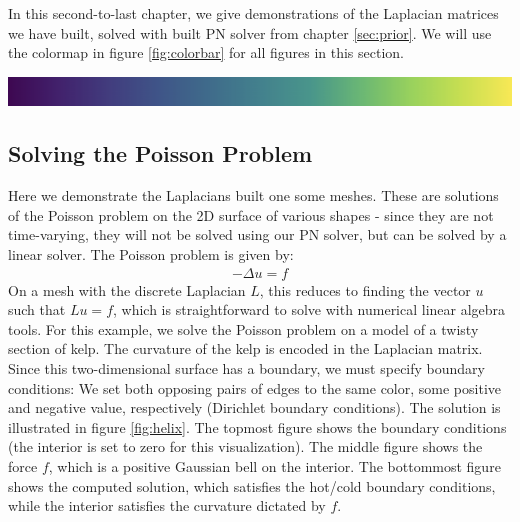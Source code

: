 \ifdefined\COMPILINGFROMMAIN
\else
    
    
\fi
\noindent
In this second-to-last chapter, we give demonstrations of the Laplacian matrices we have built, solved with built PN solver from chapter \ref{sec:prior}. We will use the colormap in figure \ref{fig:colorbar} for all figures in this section.
\\
\begin{center}
    \includegraphics[width=1.0\columnwidth]{../images/colorbar.png}
    \label{fig:colorbar}
\end{center}
\noindent

\subsection*{Solving the Poisson Problem}
Here we demonstrate the Laplacians built one some meshes. These are solutions of the Poisson problem on the 2D surface of various shapes - since they are not time-varying, they will not be solved using our PN solver, but can be solved by a linear solver. The Poisson problem is given by:
\begin{align}
    -\Delta u = f
\end{align}
On a mesh with the discrete Laplacian $L$, this reduces to finding the vector $u$ such that $Lu = f$, which is straightforward to solve with numerical linear algebra tools. For this example, we solve the Poisson problem on a model of a twisty section of kelp. The curvature of the kelp is encoded in the Laplacian matrix. Since this two-dimensional surface has a boundary, we must specify boundary conditions: We set both opposing pairs of edges to the same color, some positive and negative value, respectively (Dirichlet boundary conditions). The solution is illustrated in figure \ref{fig:helix}. The topmost figure shows the boundary conditions (the interior is set to zero for this visualization). The middle figure shows the force $f$, which is a positive Gaussian bell on the interior. The bottommost figure shows the computed solution, which satisfies the hot/cold boundary conditions, while the interior satisfies the curvature dictated by $f$.

